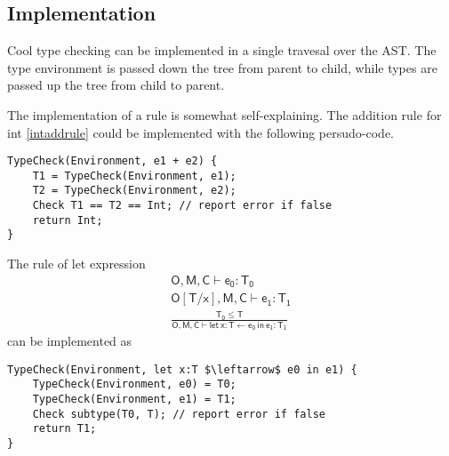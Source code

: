 \subsection{Implementation}
Cool type checking can be implemented in a single travesal over the AST. The type environment is passed down the tree from parent to child, while types are passed up the tree from child to parent.

The implementation of a rule is somewhat self-explaining. The addition rule for int \eqref{intaddrule} could be implemented with the following persudo-code.
\begin{lstlisting}
TypeCheck(Environment, e1 + e2) {
	T1 = TypeCheck(Environment, e1);
	T2 = TypeCheck(Environment, e2);
	Check T1 == T2 == Int; // report error if false
	return Int;
}
\end{lstlisting}
The rule of {\sf let} expression 
\begin{gather*}
\mathsf{O,M,C\vdash e_0:T_0}\\
\mathsf{O[T/x],M,C\vdash e_1:T_1}\\
\mathsf{\frac{T_0\leq T}{ O,M,C\vdash let\:x:T\leftarrow e_0\:in\:e_1:T_1}}
\end{gather*}
can be implemented as 
\begin{lstlisting}[mathescape = true]
TypeCheck(Environment, let x:T $\leftarrow$ e0 in e1) {
	TypeCheck(Environment, e0) = T0;
	TypeCheck(Environment, e1) = T1;
	Check subtype(T0, T); // report error if false
	return T1;
}
\end{lstlisting}
\ifx\PREAMBLE\undefined

\fi
